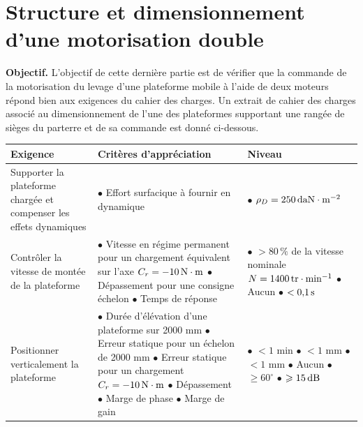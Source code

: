 \section{Structure et dimensionnement d'une motorisation double}

\textbf{Objectif.} L'objectif de cette dernière partie est de vérifier que la commande de la motorisation du levage d'une plateforme mobile à l'aide de deux moteurs répond bien aux exigences du cahier des charges. Un extrait de cahier des charges associé au dimensionnement de l'une des plateformes supportant une rangée de sièges du parterre et de sa commande est donné ci-dessous.

\begin{center}
\begin{tabular}{|p{3.4cm}|p{7cm}|p{4.2cm}|}
\hline
\textbf{Exigence} & \textbf{Critères d'appréciation} & \textbf{Niveau} \\
\hline
Supporter la plateforme chargée et compenser les effets dynamiques &
$\bullet$ Effort surfacique à fournir en dynamique &
$\bullet$ $\rho_D=250\,\mathrm{daN\cdot m^{-2}}$ \\
\hline
Contrôler la vitesse de montée de la plateforme &
$\bullet$ Vitesse en régime permanent pour un chargement équivalent sur l'axe $C_r=-10\,\mathrm{N\cdot m}$\newline
$\bullet$ Dépassement pour une consigne échelon\newline
$\bullet$ Temps de réponse &
$\bullet$ $>80\,\%$ de la vitesse nominale $N=1400\,\mathrm{tr\cdot min^{-1}}$\newline
$\bullet$ Aucun\newline
$\bullet$ $<0{,}1\,\mathrm{s}$ \\
\hline
Positionner verticalement la plateforme &
$\bullet$ Durée d'élévation d'une plateforme sur 2000 mm\newline
$\bullet$ Erreur statique pour un échelon de 2000 mm\newline
$\bullet$ Erreur statique pour un chargement $C_r=-10\,\mathrm{N\cdot m}$\newline
$\bullet$ Dépassement\newline
$\bullet$ Marge de phase\newline
$\bullet$ Marge de gain &
$\bullet$ $<1$ min\newline
$\bullet$ $<1$ mm\newline
$\bullet$ $<1$ mm\newline
$\bullet$ Aucun\newline
$\bullet$ $\geqslant 60^\circ$\newline
$\bullet$ $\geqslant 15\,\mathrm{dB}$ \\
\hline
\end{tabular}
\end{center}

